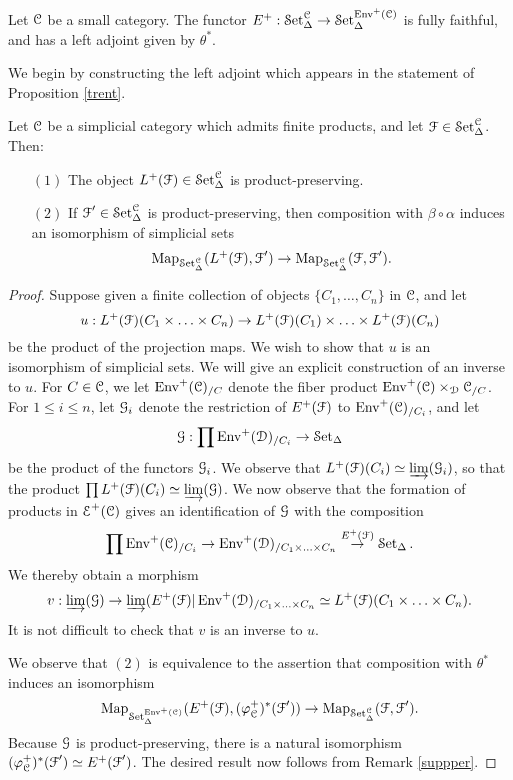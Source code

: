 \begin{remark}\label{suppper}
Let $\calC$ be a small category. The functor $E^{+}: \Set_{\Delta}^{\calC} \rightarrow
\Set_{\Delta}^{\Env^{+}(\calC)}$ is fully faithful, and has a left adjoint given by $\theta^{\ast}$. 
\end{remark}

We begin by constructing the left adjoint which appears in the statement of Proposition \ref{trent}.

\begin{lemma}\label{toughluff}
Let $\calC$ be a simplicial category which admits finite products, and let $\calF \in \Set_{\Delta}^{\calC}$. Then:
\begin{itemize}
\item[$(1)$] The object $L^{+}(\calF) \in \Set_{\Delta}^{\calC}$ is product-preserving.
\item[$(2)$] If $\calF' \in \Set_{\Delta}^{\calC}$ is product-preserving, then composition with $\beta \circ \alpha$ induces an isomorphism of simplicial sets
$$ \bHom_{ \Set_{\Delta}^{\calC} }(L^{+}(\calF), \calF') \rightarrow \bHom_{\Set_{\Delta}^{\calC}}( \calF, \calF').$$
\end{itemize}
\end{lemma}

\begin{proof}
Suppose given a finite collection of objects $\{ C_1, \ldots, C_n \}$ in $\calC$, and let
$$u: L^{+}(\calF)( C_1 \times \ldots \times C_n) \rightarrow L^{+}(\calF)(C_1) \times \ldots \times L^{+}(\calF)(C_n)$$ be the product of the projection maps. We wish to show that $u$ is an isomorphism of simplicial sets. We will give an explicit construction of an inverse to $u$. For
$C \in \calC$, we let $\Env^{+}(\calC)_{/C}$ denote the fiber product
$\Env^{+}(\calC) \times_{\calD} \calC_{/C}$. For $1 \leq i \leq n$, let $\calG_i$ denote the restriction of $E^{+}(\calF)$ to $\Env^{+}(\calC)_{/C_i}$, and let 
$$ \calG: \prod \Env^{+}(\calD)_{/C_i} \rightarrow \sSet$$
be the product of the functors $\calG_i$. We observe that $L^{+}(\calF)(C_i) \simeq \varinjlim( \calG_i )$, so that the product $\prod L^{+}(\calF)(C_i) \simeq \varinjlim( \calG)$. We now observe that the formation of products in $\calE^{+}(\calC)$ gives an identification of $\calG$ with the composition
$$ \prod \Env^{+}(\calC)_{/C_i} \rightarrow \Env^{+}(\calD)_{/ C_1 \times \ldots \times C_n }
\stackrel{ E^{+}(\calF) }{\rightarrow} \sSet.$$
We thereby obtain a morphism $$v: \varinjlim(\calG) \rightarrow \varinjlim( E^{+}(\calF) | \Env^{+}(\calD)_{/  C_1 \times \ldots \times C_n} \simeq L^{+}(\calF)( C_1 \times \ldots \times C_n).$$
It is not difficult to check that $v$ is an inverse to $u$. 

We observe that $(2)$ is equivalence to the assertion that composition with $\theta^{\ast}$ induces an isomorphism
$$ \bHom_{ \Set_{\Delta}^{\Env^{+}(\calC)} }( E^{+}(\calF), (\phi_{\calC}^{+})^{\ast}(\calF'))
\rightarrow \bHom_{\Set_{\Delta}^{\calC}}( \calF, \calF').$$
Because $\calG$ is product-preserving, there is a natural isomorphism
$( \phi_{\calC}^{+})^{\ast}(\calF') \simeq E^{+}(\calF')$. The desired result now follows from Remark \ref{suppper}.
\end{proof}

